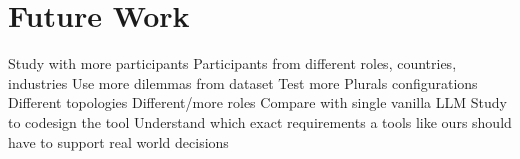 \section{Future Work}

Study with more participants
Participants from different roles, countries, industries
Use more dilemmas from dataset
Test more Plurals configurations
Different topologies
Different/more roles
Compare with single vanilla LLM
Study to codesign the tool
Understand which exact requirements a tools like ours should have to support real world decisions
